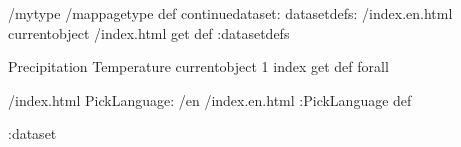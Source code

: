 \begin{ingrid}
/mytype /mappagetype def
continuedataset:
datasetdefs:
/index.en.html currentobject /index.html get def
:datasetdefs

{Precipitation Temperature} { currentobject 1 index get def } forall

/index.html {
PickLanguage:
/en /index.en.html
:PickLanguage
} def

:dataset
\end{ingrid}

